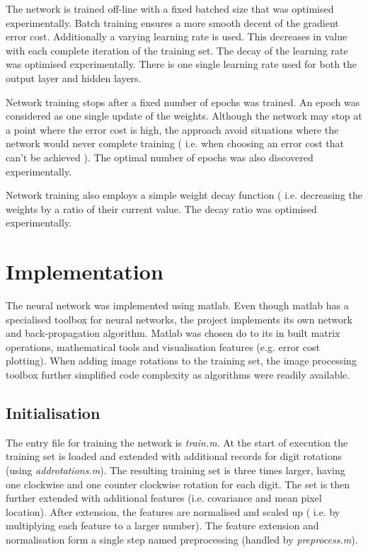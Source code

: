 \documentclass[11]{article}
\begin{document}
The network is trained off-line with a fixed batched size that was optimised experimentally. Batch training ensures a more smooth decent of the gradient error cost. Additionally a varying learning rate is used. This decreases in value with each complete iteration of the training set. The decay of the learning rate was optimised experimentally. There is one single learning rate used for both the output layer and hidden layers.

Network training stops after a fixed number of epochs was trained. An epoch was considered as one single update of the weights. Although the network may stop at a point where the error cost is high, the approach avoid situations where the network would never complete training ( i.e. when choosing an error cost that can't be achieved ). The optimal number of epochs was also discovered experimentally. 

Network training also employs a simple weight decay function ( i.e. decreasing the weights by a ratio of their current value. The decay ratio was optimised experimentally. 

\section{Implementation}

The neural network was implemented using matlab. Even though matlab has a specialised toolbox for neural networks, the project implements its own network and back-propagation algorithm. Matlab was chosen do to its in built matrix operations, mathematical tools and visualisation features (e.g. error cost plotting). When adding image rotations to the training set, the image processing toolbox further simplified code complexity as algorithms were readily available.

\subsection{Initialisation}

The entry file for training the network is \emph{train.m}. At the start of execution the training set is loaded and extended with additional records for digit rotations (using \emph{addrotations.m}). The resulting training set is three times larger, having one clockwise and one counter clockwise rotation for each digit. The set is then further extended with additional features (i.e. covariance and mean pixel location). After extension, the features are normalised and scaled up ( i.e. by multiplying each feature to a larger number). The feature extension and normalisation form a single step named preprocessing (handled by \emph{preprocess.m}).
\end{document}
